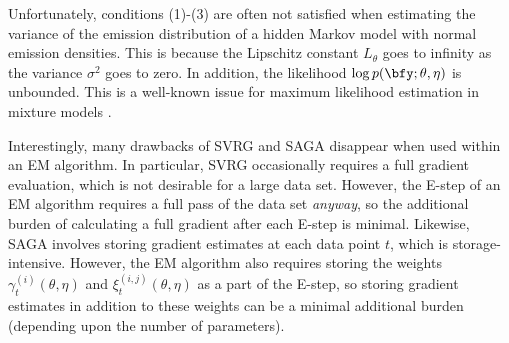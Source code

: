 


Unfortunately, conditions (1)-(3) are often not satisfied when estimating the variance of the emission distribution of a hidden Markov model with normal emission densities. This is because the Lipschitz constant $L_\theta$ goes to infinity as the variance $\sigma^2$ goes to zero. In addition, the likelihood $\log p(\bfy ; \theta, \eta)$ is unbounded. This is a well-known issue for maximum likelihood estimation in mixture models \citep{Chen:2009,Liu:2015b}.

Interestingly, many drawbacks of SVRG and SAGA disappear when used within an EM algorithm. In particular, SVRG occasionally requires a full gradient evaluation, which is not desirable for a large data set. However, the E-step of an EM algorithm requires a full pass of the data set \textit{anyway}, so the additional burden of calculating a full gradient after each E-step is minimal. Likewise, SAGA involves storing gradient estimates at each data point $t$, which is storage-intensive. However, the EM algorithm also requires storing the weights $\gamma_t^{(i)}(\theta, \eta)$ and $\xi_t^{(i,j)}(\theta, \eta)$ as a part of the E-step, so storing gradient estimates in addition to these weights can be a minimal additional burden (depending upon the number of parameters).


